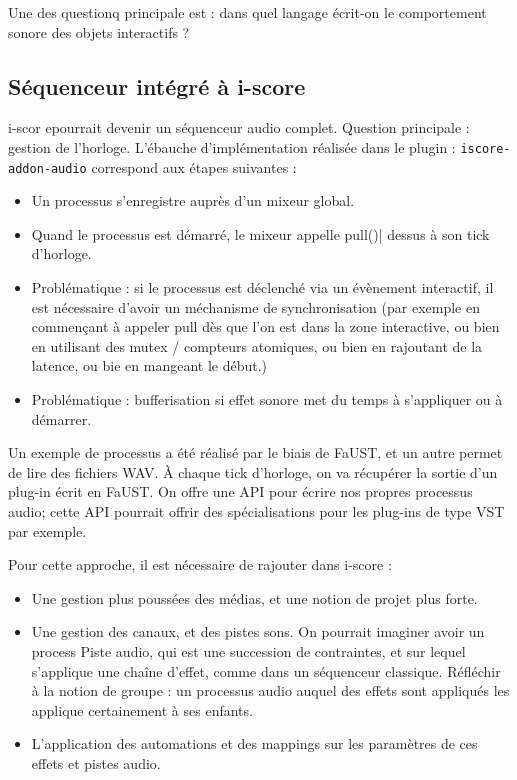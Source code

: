 \documentclass[french,12pt,a4paper]{article}
\begin{document}
Une des questionq principale est : dans quel langage écrit-on le comportement 
sonore des objets interactifs ?
\subsection{Séquenceur intégré à i-score}
i-scor epourrait devenir un séquenceur audio complet.
Question principale : gestion de l'horloge.
L'ébauche d'implémentation réalisée dans le plugin : \lstinline|iscore-addon-audio|
correspond aux étapes suivantes : 
\begin{itemize}
\item Un processus s'enregistre auprès d'un mixeur global.
\item Quand le processus est démarré, le mixeur appelle \lstinline||pull()| dessus à son tick d'horloge.
\item Problématique : si le processus est déclenché via un évènement interactif, il est nécessaire d'avoir un méchanisme de synchronisation (par exemple en commençant à appeler pull dès que l'on est dans la zone interactive, ou bien en utilisant des mutex / compteurs atomiques, ou bien en rajoutant de la latence, ou bie en mangeant le début.)
\item Problématique : bufferisation si effet sonore met du temps à s'appliquer ou à démarrer.
\end{itemize}

Un exemple de processus a été réalisé par le biais de FaUST, et un autre permet de lire des fichiers WAV.
À chaque tick d'horloge, on va récupérer la sortie d'un plug-in écrit en FaUST.
On offre une API pour écrire nos propres processus audio; cette API pourrait offrir des spécialisations pour les plug-ins de type VST par exemple.

Pour cette approche, il est nécessaire de rajouter dans i-score : 
\begin{itemize}
    \item Une gestion plus poussées des médias, et une notion de projet plus forte.
    \item Une gestion des canaux, et des pistes sons.
    On pourrait imaginer avoir un process Piste audio, qui est une succession de contraintes, et sur lequel s'applique une chaîne d'effet, comme dans un séquenceur classique.
    Réfléchir à la notion de groupe : un processus audio auquel des effets sont appliqués les applique certainement à ses enfants.
    \item L'application des automations et des mappings sur les paramètres de ces effets et pistes audio.
\end{itemize}
\end{document}
